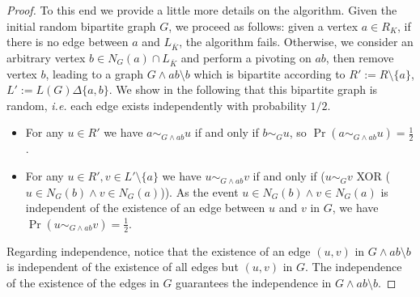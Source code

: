 \documentclass[10pt,a4paper]{article}
\newcommand{\sm}{\setminus}
\begin{document}
\begin{proof}
    To this end we provide a little more details on the algorithm. Given the initial random bipartite graph $G$, we proceed as follows: given a vertex $a\in R_K$, if there is no edge between $a$ and $L_{\overline K}$, the algorithm fails. Otherwise, we consider an arbitrary vertex $b\in N_G(a)\cap L_{\overline K}$ and perform a pivoting on $ab$, then remove vertex $b$, leading to a graph $G\wedge ab\setminus b$ which is bipartite according to $R':=R\setminus \{a\}$, $L':=L(G)\Delta\{a,b\}$. We show in the following that this bipartite graph is random, \emph{i.e.} each edge exists independently with probability $1/2$.    
    \begin{itemize}
        \item For any $u\in R'$ we have $a\sim_{G\wedge ab} u$ if and only if $b\sim_{G} u$, so $\Pr(a\sim_{G\wedge ab} u)=\frac12$.
        \item For any $u\in R', v\in L'\setminus \{a\}$ we have $u\sim_{G\wedge ab} v$  if and only if  ($u\sim_{G} v$ XOR ($u\in N_G(b)\wedge v\in N_G(a)$)). As the event $u\in N_G(b)\wedge v\in N_G(a)$ is independent of the existence of an edge between $u$ and $v$ in $G$, we have $\Pr(u\sim_{G\wedge ab} v)=\frac12$.
    \end{itemize}
    Regarding independence, notice that the existence of an edge $(u,v)$ in $G\wedge ab\sm b$ is independent of the existence of all edges but $(u,v)$ in $G$. The independence of the existence of the edges in $G$ guarantees the independence in $G\wedge ab \sm b$.


\end{proof}
\end{document}
